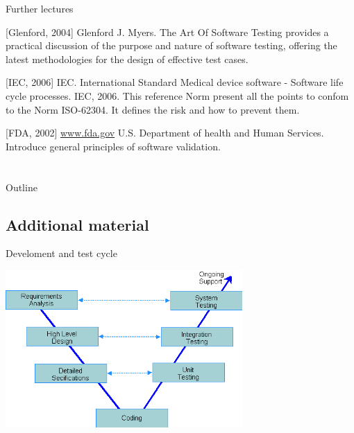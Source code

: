 \documentclass{beamer}
\begin{document}

\begin{frame}{Further lectures}
\begin{thebibliography}{10}
[Glenford, 2004]
  Glenford J. Myers.
  \newblock The Art Of Software Testing
  \newblock provides a practical discussion of the purpose and nature of software testing, offering the latest methodologies for the design of effective test cases.

[IEC, 2006]
IEC. International Standard Medical device software - Software life cycle processes.
\newblock IEC, 2006. This reference Norm present all the points to confom to the Norm ISO-62304. It defines the risk and how to prevent them.

[FDA, 2002]
\url{www.fda.gov}
\newblock U.S. Department of health and Human Services. Introduce general principles of software validation.

\end{thebibliography}
\end{frame}


\appendix
\section{\appendixname}
\begin{frame}{Outline}
	\tableofcontents
\end{frame}


\subsection{Additional material}

\begin{frame}{Develoment and test cycle}
\begin{center}
    \includegraphics[height=6cm]{img/VCycleNemo.png}
  \end{center}
\end{frame}
\end{document}
